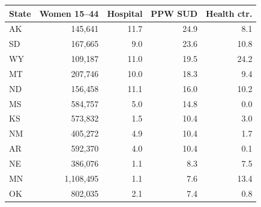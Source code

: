 \begin{tabular}{@{}lrrrr@{}}
\toprule
State & Women 15--44 & Hospital & PPW SUD & Health ctr. \\
\midrule
AK & 145{,}641 & 11.7 & 24.9 & 8.1 \\
SD & 167{,}665 & 9.0 & 23.6 & 10.8 \\
WY & 109{,}187 & 11.0 & 19.5 & 24.2 \\
MT & 207{,}746 & 10.0 & 18.3 & 9.4 \\
ND & 156{,}458 & 11.1 & 16.0 & 10.2 \\
MS & 584{,}757 & 5.0 & 14.8 & 0.0 \\
KS & 573{,}832 & 1.5 & 10.4 & 3.0 \\
NM & 405{,}272 & 4.9 & 10.4 & 1.7 \\
AR & 592{,}370 & 4.0 & 10.4 & 0.1 \\
NE & 386{,}076 & 1.1 & 8.3 & 7.5 \\
MN & 1{,}108{,}495 & 1.1 & 7.6 & 13.4 \\
OK & 802{,}035 & 2.1 & 7.4 & 0.8 \\
\bottomrule
\end{tabular}
